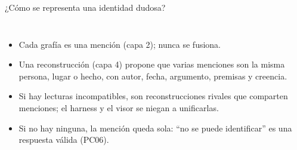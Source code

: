 \documentclass[aspectratio=169,10pt]{beamer}
\begin{document}
\begin{frame}{¿Cómo se representa una identidad dudosa?}
\begin{columns}[T]
\small
\begin{itemize}
\item Cada grafía es una mención (capa 2); nunca se fusiona.
\item Una \alert{reconstrucción} (capa 4) propone que varias menciones son la misma persona, lugar o hecho, con autor,
      fecha, argumento, premisas y creencia.
\item Si hay lecturas incompatibles, son reconstrucciones \alert{rivales} que comparten menciones; el harness y el visor
      se niegan a unificarlas.
\item Si no hay ninguna, la mención queda sola: \enquote{no se puede identificar} es una respuesta válida (PC06).
\end{itemize}
\end{columns}
\end{frame}
\end{document}
